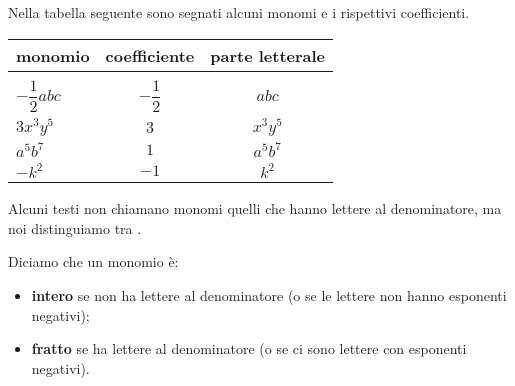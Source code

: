 \begin{esempio}{}{}
Nella tabella seguente sono segnati alcuni monomi e i rispettivi 
coefficienti.

\vspace{-1em}
\begin{center}
\begin{tabular}{lcc}
monomio & coefficiente & parte letterale \\
\hline \\[-.5em]
\(-{\dfrac{1}{2}}abc\) & \(-{\dfrac{1}{2}}\) & \(abc\) \\[1em]
\(3x^{3}y^{5}\) & \(3\) & \(x^{3}y^{5}\) \\[.5em]
\(a^{5}b^{7}\) & \(1\) & \(a^{5}b^{7}\) \\[.5em]
\(-k^{2}\) & \(-1\) & \(k^{2}\) %
\end{tabular}
\end{center}
\end{esempio}

% 
% 

Alcuni testi non chiamano monomi quelli che hanno lettere al 
denominatore, ma noi distinguiamo tra 
.

\begin{definizione}{}{}
Diciamo che un monomio è: 
\begin{itemize} [nosep]
\item \textbf{intero} se non ha lettere al denominatore
(o se le lettere non hanno esponenti negativi);
\item \textbf{fratto} se ha lettere al denominatore
(o se ci sono lettere con esponenti negativi).
\end{itemize}
\end{definizione}

